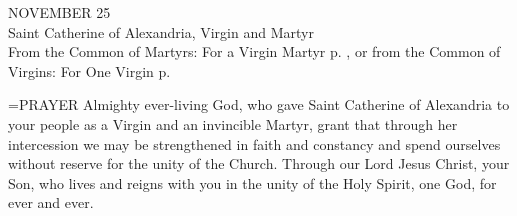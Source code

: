 \begin{center}\normalsize NOVEMBER 25\\
\footnotesize Saint Catherine of Alexandria, Virgin and Martyr\\
\footnotesize From the Common of Martyrs: For a Virgin Martyr p.   , or from the Common of\\
\footnotesize Virgins: For One Virgin p.  \\
\end{center}

\hangindent=\parindent \small{PRAYER 
Almighty ever-living God,
who gave Saint Catherine of Alexandria to your people
as a Virgin and an invincible Martyr,
grant that through her intercession
we may be strengthened in faith and constancy
and spend ourselves without reserve
for the unity of the Church.
Through our Lord Jesus Christ, your Son,
who lives and reigns with you in the unity of the Holy Spirit,
one God, for ever and ever.\\}
 

